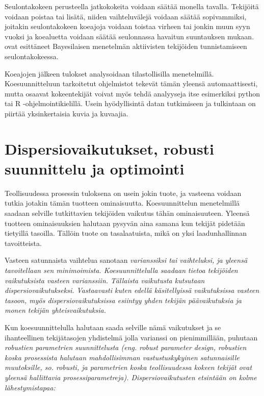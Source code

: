 \documentclass[12pt,a4paper,finnish]{tutthesis}
\begin{document}
Seulontakokeen perusteella jatkokokeita voidaan säätää monella tavalla.
Tekijöitä voidaan poistaa tai lisätä, niiden vaihteluvälejä voidaan
säätää sopivammiksi, joitakin seulontakokeen koeajoja voidaan toistaa
virheen tai jonkin muun syyn vuoksi ja koealuetta voidaan säätää
seulonnassa havaitun suuntauksen mukaan.
\textcite{box1993} ovat esittäneet Bayesilaisen menetelmän
aktiivisten tekijöiden tunnistamiseen seulontakokeessa.



Koeajojen jälkeen tulokset analysoidaan tilastollisilla menetelmillä.
Koesuunnitteluun tarkoitetut ohjelmistot tekevät tämän yleensä
automaattisesti, mutta osaavat kokeentekijät voivat myös tehdä
analyyseja itse esimerkiksi python tai R -ohjelmointikielillä.
Usein hyödyllisintä datan tutkimiseen ja tulkintaan on
piirtää yksinkertaisia kuvia ja kuvaajia.



\section{Dispersiovaikutukset, robusti suunnittelu ja optimointi}

Teollisuudessa prosessin tuloksena on usein jokin tuote, ja vasteena voidaan
tutkia jotakin tämän tuotteen ominaisuutta. Koesuunnittelun menetelmillä
saadaan selville tutkittavien tekijöiden vaikutus tähän ominaisuuteen.
Yleensä tuotteen ominaisuuksien halutaan pysyvän aina samana kun
tekijät pidetään tietyillä tasoilla. Tällöin tuote on tasalaatuista, mikä
on yksi laadunhallinnan tavoitteista.

Vasteen satunnaista vaihtelua sanotaan \em varianssiksi \em tai \em vaihteluksi, \em
ja yleensä tavoitellaan sen minimoimista. Koesuunnittelulla saadaan
tietoa tekijöiden vaikutuksista vasteen varianssiin. Tällaista vaikutusta
kutsutaan \em dispersiovaikutukseksi. \em
Vastaavasti kuten edellä käsitellyissä vaikutuksissa vasteen tasoon,
myös dispersiovaikutuksissa esiintyy yhden tekijän päävaikutuksia
ja monen tekijän yhteisvaikutuksia.


Kun koesuunnittelulla halutaan saada selville nämä vaikutukset
ja se ihanteellinen tekijätasojen yhdistelmä jolla varianssi on pienimmillään,
puhutaan \em robustien parametrien suunnittelusta \em (eng. robust
parameter design, robustien koska prosessista halutaan mahdollisimman
vastustuskykyinen satunnaisille muutoksille, so. robusti, ja parametrien koska
teollisuudessa kokeen tekijät ovat yleensä hallittavia prosessiparametreja).
Dispersiovaikutusten etsintään on kolme lähestymistapaa:
\end{document}
